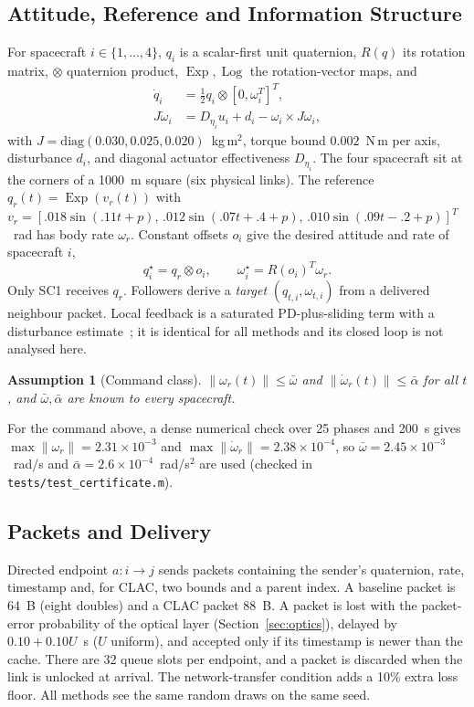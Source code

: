 \documentclass[journal]{IEEEtran}
\DeclareMathOperator{\Log}{Log}
\DeclareMathOperator{\Exp}{Exp}
\newtheorem{assumption}{Assumption}
\begin{document}
\subsection{Attitude, Reference and Information Structure}
For spacecraft $i\in\{1,\dots,4\}$, $q_i$ is a scalar-first unit quaternion, $R(q)$ its rotation matrix, $\otimes$ quaternion product, $\Exp,\Log$ the rotation-vector maps, and
\begin{align}
\dot q_i &= \tfrac12 q_i\otimes[0,\omega_i^T]^T,\\
J\dot\omega_i &= D_{\eta_i}u_i+d_i-\omega_i\times J\omega_i,
\end{align}
with $J=\mathrm{diag}(0.030,0.025,0.020)$~kg\,m$^2$, torque bound $0.002$~N\,m per axis, disturbance $d_i$, and diagonal actuator effectiveness $D_{\eta_i}$. The four spacecraft sit at the corners of a 1000~m square (six physical links). The reference $q_r(t)=\Exp(v_r(t))$ with $v_r=[.018\sin(.11t+p),\,.012\sin(.07t+.4+p),\,.010\sin(.09t-.2+p)]^T$~rad has body rate $\omega_r$. Constant offsets $o_i$ give the desired attitude and rate of spacecraft $i$,
\begin{equation}
q_i^\star=q_r\otimes o_i,\qquad \omega_i^\star=R(o_i)^T\omega_r .
\end{equation}
Only SC1 receives $q_r$. Followers derive a \emph{target} $(q_{t,i},\omega_{t,i})$ from a delivered neighbour packet. Local feedback is a saturated PD-plus-sliding term with a disturbance estimate~\cite{liu2018}; it is identical for all methods and its closed loop is not analysed here.

\begin{assumption}[Command class]\label{as:ref}
$\|\omega_r(t)\|\le\bar\omega$ and $\|\dot\omega_r(t)\|\le\bar\alpha$ for all $t$, and $\bar\omega,\bar\alpha$ are known to every spacecraft.
\end{assumption}
For the command above, a dense numerical check over 25 phases and 200~s gives $\max\|\omega_r\|=2.31\times10^{-3}$ and $\max\|\dot\omega_r\|=2.38\times10^{-4}$, so $\bar\omega=2.45\times10^{-3}$~rad/s and $\bar\alpha=2.6\times10^{-4}$~rad/s$^2$ are used (checked in \texttt{tests/test\_certificate.m}).

\subsection{Packets and Delivery}
Directed endpoint $a:i\to j$ sends packets containing the sender's quaternion, rate, timestamp and, for CLAC, two bounds and a parent index. A baseline packet is 64~B (eight doubles) and a CLAC packet 88~B. A packet is lost with the packet-error probability of the optical layer (Section~\ref{sec:optics}), delayed by $0.10+0.10U$~s ($U$ uniform), and accepted only if its timestamp is newer than the cache. There are 32 queue slots per endpoint, and a packet is discarded when the link is unlocked at arrival. The network-transfer condition adds a 10\% extra loss floor. All methods see the same random draws on the same seed.
\end{document}

